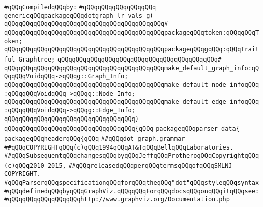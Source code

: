 \label{src/lib/std/dot/dot-graph.grammar.pkg}
\newline
\verb|#qQQqCompiledqQQqby:|\newline
\verb|#qQQqqQQqqQQqqQQqqQQq|\newline
\newline
\verb|genericqQQqpackageqQQqdotgraph_lr_vals_g(|\newline
\verb|qQQqqQQqqQQqqQQqqQQqqQQqqQQqqQQqqQQqqQQqqQQq#|\newline
\verb|qQQqqQQqqQQqqQQqqQQqqQQqqQQqqQQqqQQqqQQqqQQqpackageqQQqtoken:qQQqqQQqToken;|\newline
\verb|qQQqqQQqqQQqqQQqqQQqqQQqqQQqqQQqqQQqqQQqqQQqpackageqQQqgqQQq:qQQqTraitful_Graphtree;|\newline
\verb|qQQqqQQqqQQqqQQqqQQqqQQqqQQqqQQqqQQqqQQqqQQq#|\newline
\verb|qQQqqQQqqQQqqQQqqQQqqQQqqQQqqQQqqQQqqQQqqQQqmake_default_graph_info:qQQqqQQqVoidqQQq->qQQqg::Graph_Info;|\newline
\verb|qQQqqQQqqQQqqQQqqQQqqQQqqQQqqQQqqQQqqQQqqQQqmake_default_node_infoqQQq:qQQqqQQqVoidqQQq->qQQqg::Node_Info;|\newline
\verb|qQQqqQQqqQQqqQQqqQQqqQQqqQQqqQQqqQQqqQQqqQQqmake_default_edge_infoqQQq:qQQqqQQqVoidqQQq->qQQqg::Edge_Info;|\newline
\verb|qQQqqQQqqQQqqQQqqQQqqQQqqQQqqQQqqQQq)|\newline
\verb|qQQqqQQqqQQqqQQqqQQqqQQqqQQqqQQqqQQq{qQQq|\newline
\verb|packageqQQqparser_data{|\newline
\verb|packageqQQqheaderqQQq{qQQq|\newline
\verb|##qQQqdot-graph.grammar|\newline
\verb|##qQQqCOPYRIGHTqQQq(c)qQQq1994qQQqAT&TqQQqBellqQQqLaboratories.|\newline
\verb|##qQQqSubsequentqQQqchangesqQQqbyqQQqJeffqQQqProtheroqQQqCopyrightqQQq(c)qQQq2010-2015,|\newline
\verb|##qQQqreleasedqQQqperqQQqtermsqQQqofqQQqSMLNJ-COPYRIGHT.|\newline
\newline
\verb|#qQQqParserqQQqspecificationqQQqforqQQqtheqQQq"dot"qQQqstyleqQQqsyntax|\newline
\verb|#qQQqdefinedqQQqbyqQQqGraphViz.qQQqqQQqForqQQqdocsqQQqonqQQqitqQQqsee:|\newline
\verb|#qQQqqQQqqQQqqQQqqQQqhttp://www.graphviz.org/Documentation.php|\newline
